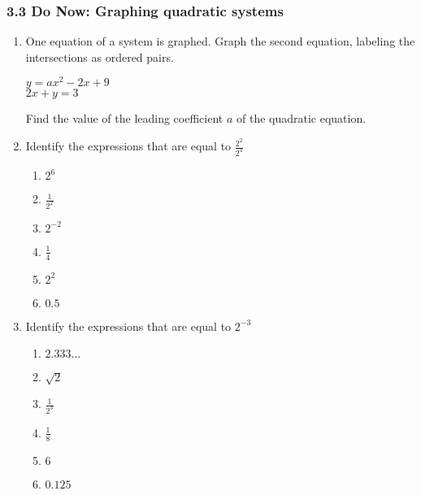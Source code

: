 \documentclass[12pt, twoside]{article}
\begin{document}
\subsubsection*{3.3 Do Now: Graphing quadratic systems}
\begin{enumerate}
  \item One equation of a system is graphed. Graph the second equation, labeling the intersections as ordered pairs.

  \begin{multicols}{2}
    $y = ax^2 - 2x + 9$ \\
    \columnbreak
    $2x + y = 3$
    \end{multicols}
    Find the value of the leading coefficient $a$ of the quadratic equation. \vspace{2cm}

  \begin{center}
  \end{center}

\newpage
\item Identify the expressions that are equal to $\displaystyle \frac{2^2}{2^4}$
  \begin{multicols}{2}
  \begin{enumerate}
      \item $2^6$
      \item $\displaystyle \frac{1}{2^2}$
      \item $2^{-2}$
      \item $\frac{1}{4}$
      \item $2^{2}$
      \item $0.5$
  \end{enumerate}
  \end{multicols}

\item Identify the expressions that are equal to $\displaystyle 2^{-3}$
  \begin{multicols}{2}
  \begin{enumerate}
      \item $2.333...$
      \item $\sqrt{2}$
      \item $\displaystyle \frac{1}{2^3}$
      \item $\displaystyle \frac{1}{8}$
      \item $6$
      \item $0.125$
  \end{enumerate}
  \end{multicols}


\end{enumerate}
\end{document}

